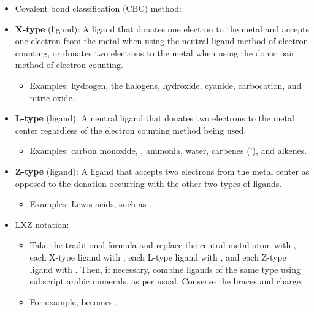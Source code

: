 \documentclass[../notes.tex]{subfiles}
\begin{document}
\begin{itemize}
\begin{itemize}
    \end{itemize}
    \item Covalent bond classification (CBC) method:
    \item \textbf{X-type} (ligand): A ligand that donates one electron to the metal and accepts one electron from the metal when using the neutral ligand method of electron counting, or donates two electrons to the metal when using the donor pair method of electron counting.
    \begin{itemize}
        \item Examples: hydrogen, the halogens, hydroxide, cyanide, carbocation, and nitric oxide.
    \end{itemize}
    \item \textbf{L-type} (ligand): A neutral ligand that donates two electrons to the metal center regardless of the electron counting method being used.
    \begin{itemize}
        \item Examples: carbon monoxide, , ammonia, water, carbenes ('), and alkenes.
    \end{itemize}
    \item \textbf{Z-type} (ligand): A ligand that accepts two electrons from the metal center as opposed to the donation occurring with the other two types of ligands.
    \begin{itemize}
        \item Examples: Lewis acids, such as .
    \end{itemize}
    \item LXZ notation:
    \begin{itemize}
        \item Take the traditional formula and replace the central metal atom with , each X-type ligand with , each L-type ligand with , and each Z-type ligand with . Then, if necessary, combine ligands of the same type using subscript arabic numerals, as per usual. Conserve the braces and charge.
        \item For example,  becomes .
    \end{itemize}
\end{itemize}
\end{document}

